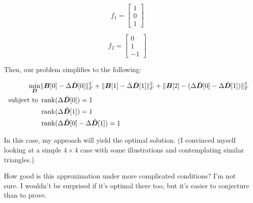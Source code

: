 \documentclass{article}
\begin{document}
\begin{equation}
f_1 = \begin{bmatrix} 1 \\
                      0 \\
                      1
      \end{bmatrix}
\end{equation}

\begin{equation}
f_2 = \begin{bmatrix} 0 \\
                      1 \\
                      -1
      \end{bmatrix}
\end{equation}

Then, our problem simplifies to the following:

\begin{equation}
\begin{aligned}
\min_{\bm{D}} & \|\bm{B}[0] - \Delta \hat{\bm{D}}[0]\|_F^2 + \|\bm{B}[1] - \Delta \hat{\bm{D}}[1]\|_F^2 + \|\bm{B}[2] - (\Delta \hat{\bm{D}}[0] - \Delta \hat{\bm{D}}[1])\|_F^2  \\
\text{ subject to } & \operatorname{rank}(\Delta \hat{\bm{D}}[0]) = 1 \\
& \operatorname{rank}(\Delta \hat{\bm{D}}[1]) = 1 \\
& \operatorname{rank}(\Delta \hat{\bm{D}}[0] - \Delta \hat{\bm{D}}[1]) = 1
\end{aligned}
\end{equation}

In this case, my approach will yield the optimal solution. (I convinced myself looking at a simple $4 \times 4$ case with some illustrations and contemplating similar triangles.)

How good is this approximation under more complicated conditions?  I'm not sure.  I wouldn't be surprised if it's optimal there too, but it's easier to conjecture than to prove.
\end{document}
